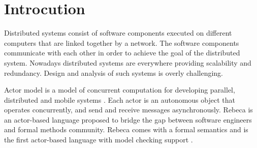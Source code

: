 \section{Introcution} \label{sec::introduction}




Distributed systems consist of software components executed on different computers that are linked together by a network. The software components communicate with each other in order to achieve the goal of the distributed system.
Nowadays distributed systems are everywhere providing scalability and redundancy.  Design and analysis of such systems is overly challenging.

Actor model is a model of concurrent computation for developing parallel, distributed and mobile systems \cite{Hewitt:77:Actors,Agha:97:ActorComputation}. Each actor is an autonomous object that operates concurrently, and  send and receive messages asynchronously.
%
Rebeca \cite{DBLP:journals/fuin/SirjaniMSB04,DBLP:conf/fmco/Sirjani06} is an actor-based language proposed to bridge the gap between software engineers and formal methods community.
Rebeca comes with a formal semantics and is the first actor-based language with model checking support \cite{DBLP:journals/csur/BoerSHHRDJSKFY17}.


